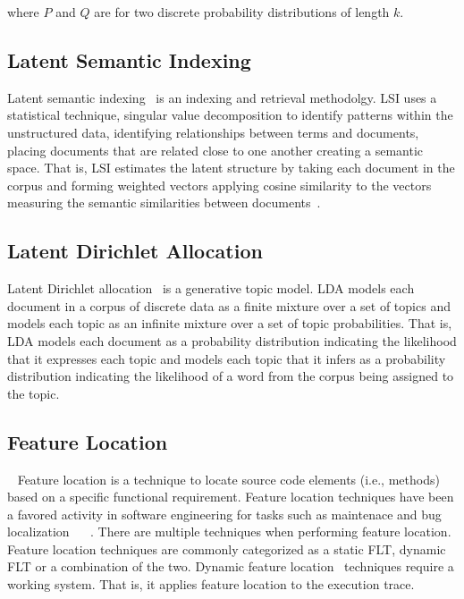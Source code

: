 where $P$ and $Q$ are for two discrete probability distributions of length $k$.

\subsection{Latent Semantic Indexing}

Latent semantic indexing~\cite{Deerwester-etal:1990} is an indexing and
retrieval methodolgy. LSI uses a statistical technique, singular value
decomposition to identify patterns within the unstructured data, identifying relationships 
between terms and documents, placing documents that are related close to one another 
creating a semantic space. That is, LSI estimates the latent structure by taking each 
document in the corpus and forming weighted vectors applying cosine similarity to the vectors 
measuring the semantic similarities between documents~\cite{Binkley-Lawrie:2010}.

\subsection{Latent Dirichlet Allocation}

Latent Dirichlet allocation~\cite{Blei-etal:2003} is a generative topic model.
LDA models each document in a corpus of discrete data as a finite mixture over a set of topics
and models each topic as an infinite mixture over a set of topic probabilities.
That is, LDA models each document as a probability distribution
indicating the likelihood that it expresses each topic and
models each topic that it infers as a probability distribution
indicating the likelihood of a word from the corpus being assigned to the topic.


\subsection{Feature Location}~\cite{972777} Feature location is a technique to
locate source code elements (i.e., methods) based on a specific functional
requirement.  Feature location techniques have been a favored activity in
software engineering for tasks such as maintenace and bug localization
~\cite{4656405} ~\cite{1374321}. There are multiple techniques when performing
feature location. Feature location techniques are commonly categorized as a
static FLT, dynamic FLT or a combination of the two. Dynamic feature
location~\cite{972777} techniques require a working system. That is, it applies
feature location to the execution trace. 
